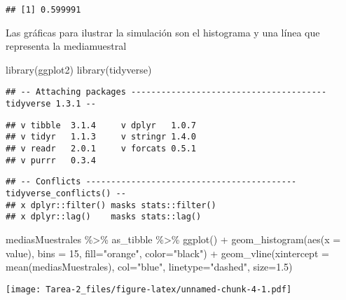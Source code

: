 \documentclass[
]{article}
\newenvironment{Shaded}{\begin{snugshade}}{\end{snugshade}}
\newcommand{\AttributeTok}[1]{\textcolor[rgb]{0.77,0.63,0.00}{#1}}
\newcommand{\DecValTok}[1]{\textcolor[rgb]{0.00,0.00,0.81}{#1}}
\newcommand{\FloatTok}[1]{\textcolor[rgb]{0.00,0.00,0.81}{#1}}
\newcommand{\FunctionTok}[1]{\textcolor[rgb]{0.00,0.00,0.00}{#1}}
\newcommand{\NormalTok}[1]{#1}
\newcommand{\SpecialCharTok}[1]{\textcolor[rgb]{0.00,0.00,0.00}{#1}}
\newcommand{\StringTok}[1]{\textcolor[rgb]{0.31,0.60,0.02}{#1}}
\begin{document}
\begin{verbatim}
## [1] 0.599991
\end{verbatim}

Las gráficas para ilustrar la simulación son el histograma y una línea
que representa la mediamuestral

\begin{Shaded}
\begin{Highlighting}[]
\FunctionTok{library}\NormalTok{(ggplot2)}
\FunctionTok{library}\NormalTok{(tidyverse)}
\end{Highlighting}
\end{Shaded}

\begin{verbatim}
## -- Attaching packages --------------------------------------- tidyverse 1.3.1 --
\end{verbatim}

\begin{verbatim}
## v tibble  3.1.4     v dplyr   1.0.7
## v tidyr   1.1.3     v stringr 1.4.0
## v readr   2.0.1     v forcats 0.5.1
## v purrr   0.3.4
\end{verbatim}

\begin{verbatim}
## -- Conflicts ------------------------------------------ tidyverse_conflicts() --
## x dplyr::filter() masks stats::filter()
## x dplyr::lag()    masks stats::lag()
\end{verbatim}

\begin{Shaded}
\begin{Highlighting}[]
\NormalTok{mediasMuestrales }\SpecialCharTok{\%\textgreater{}\%}
\NormalTok{  as\_tibble }\SpecialCharTok{\%\textgreater{}\%}
\FunctionTok{ggplot}\NormalTok{() }\SpecialCharTok{+}
  \FunctionTok{geom\_histogram}\NormalTok{(}\FunctionTok{aes}\NormalTok{(}\AttributeTok{x =}\NormalTok{ value), }\AttributeTok{bins =} \DecValTok{15}\NormalTok{, }\AttributeTok{fill=}\StringTok{"orange"}\NormalTok{, }\AttributeTok{color=}\StringTok{"black"}\NormalTok{) }\SpecialCharTok{+}
  \FunctionTok{geom\_vline}\NormalTok{(}\AttributeTok{xintercept =} \FunctionTok{mean}\NormalTok{(mediasMuestrales),}
             \AttributeTok{col=}\StringTok{"blue"}\NormalTok{, }\AttributeTok{linetype=}\StringTok{"dashed"}\NormalTok{, }\AttributeTok{size=}\FloatTok{1.5}\NormalTok{)}
\end{Highlighting}
\end{Shaded}

\texttt{[image: Tarea-2\_files/figure-latex/unnamed-chunk-4-1.pdf]}
\end{document}
